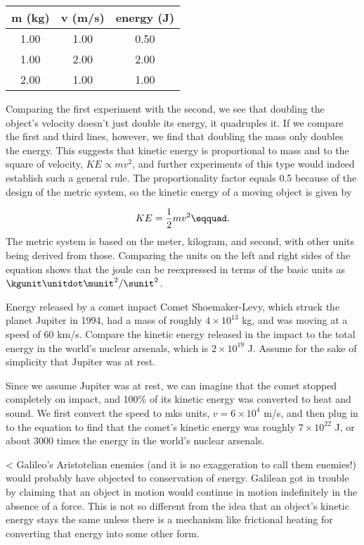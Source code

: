 \begin{tabular}{|c|c|c|} \hline
\textbf{m} (kg) & \textbf{v} (m/s) & \textbf{energy} (J) \\ \hline
1.00 & 1.00 & 0.50 \\ \hline
1.00 & 2.00 & 2.00 \\ \hline
2.00 & 1.00 & 1.00 \\ \hline
\end{tabular}

Comparing the first experiment with the second, we see that
doubling the object's velocity doesn't just double its
energy, it quadruples it. If we compare the first and third
lines, however, we find that doubling the mass only doubles
the energy. This suggests that kinetic energy is proportional
to mass and to the square of velocity, $KE\propto mv^2$, and further
experiments of this type would indeed establish such a
general rule. The proportionality factor equals 0.5 because
of the design of the metric system, so the kinetic energy of
a moving object is given by

\begin{equation*}
                KE    =    \frac{1}{2}mv^2\eqquad.
\end{equation*}
The metric system is based on the meter, kilogram, and
second, with other units being derived from those. Comparing
the units on the left and right sides of the equation shows
that the joule can be reexpressed in terms of the basic
units as $\kgunit\unitdot\munit^2/\sunit^2$.

\begin{eg}{Energy released by a comet impact}
\egquestion Comet Shoemaker-Levy, which struck the planet
Jupiter in 1994, had a mass of roughly $4\times10^{13}$ kg,
and was moving at a speed of 60 km/s. Compare the kinetic
energy released in the impact to the total energy in the
world's nuclear arsenals, which is $2\times10^{19}$ J. Assume
for the sake of simplicity that Jupiter was at rest.

\eganswer Since we assume Jupiter was at rest, we can
imagine that the comet stopped completely on impact, and
100\% of its kinetic energy was converted to heat and sound.
We first convert the speed to mks units, $v=6\times10^4$
m/s, and then plug in to the equation to find that the
comet's kinetic energy was roughly $7\times10^{22}$ J, or about
3000 times the energy in the world's nuclear arsenals.
\end{eg}

<%
Galileo's Aristotelian enemies (and it is no exaggeration to call them
enemies!) would probably have objected to conservation of
energy. Galilean got in trouble by claiming that an object in
motion would continue in motion indefinitely in the absence
of a force.  This is not so different from the idea that an
object's kinetic energy stays the same unless there is a
mechanism like frictional heating for converting that energy
into some other form.

